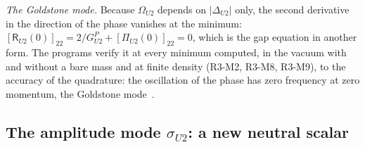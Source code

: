 \emph{The Goldstone mode.} Because $\Omega_{U2}$ depends on $|\Delta_{U2}|$ only, the second derivative
in the direction of the phase vanishes at the minimum: $[\mathsf R_{U2}(0)]_{22}=2/G^P_{U2}
+[\Pi_{U2}(0)]_{22}=0$, which is the gap equation in another form. The programs verify it at every
minimum computed, in the vacuum with and without a bare mass and at finite density (R3-M2, R3-M8,
R3-M9), to the accuracy of the quadrature: the oscillation of the phase has zero frequency at zero
momentum, the Goldstone mode~\cite{Nambu1960,Goldstone1961}.

\subsection{The amplitude mode $\sigma_{U2}$: a new neutral scalar}
\label{sec:sigma}

